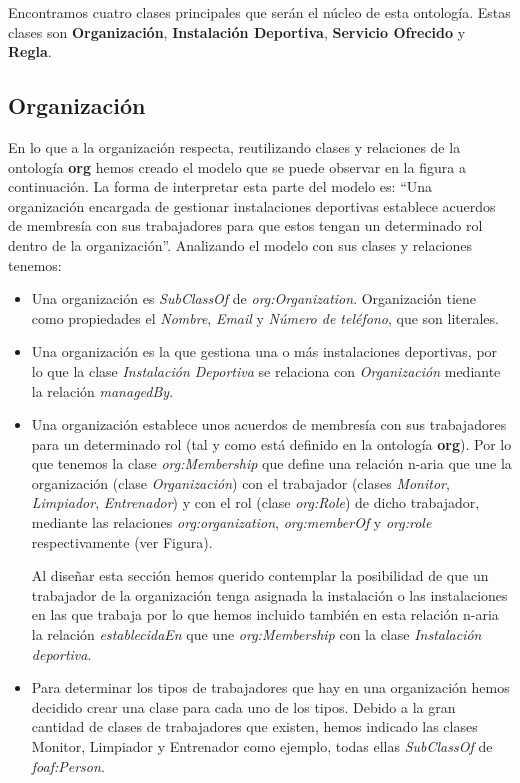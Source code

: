 \documentclass[a4paper,12pt]{article}
\begin{document}
	Encontramos cuatro clases principales que serán el núcleo de esta ontología. Estas clases son \textbf{Organización}, \textbf{Instalación Deportiva}, \textbf{Servicio Ofrecido} y \textbf{Regla}.
	
	
	\subsection{Organización}
	
	En lo que a la organización respecta, reutilizando clases y relaciones de la ontología \textbf{org} hemos creado el modelo que se puede observar en la figura a continuación. La forma de interpretar esta parte del modelo es: “Una organización encargada de gestionar instalaciones deportivas establece acuerdos de membresía con sus trabajadores para que estos tengan un determinado rol dentro de la organización”. Analizando el modelo con sus clases y relaciones tenemos:
	
	\begin{itemize}
		\item Una organización es \textit{SubClassOf} de \textit{org:Organization}. Organización tiene como propiedades el \textit{Nombre}, \textit{Email} y \textit{Número de teléfono}, que son literales.
		\item Una organización es la que gestiona una o más instalaciones deportivas, por lo que la clase \textit{Instalación Deportiva} se relaciona con \textit{Organización} mediante la relación \textit{managedBy}.
		
		\item Una organización establece unos acuerdos de membresía con sus trabajadores para un determinado rol (tal y como está definido en la ontología \textbf{org}). Por lo que tenemos la clase \textit{org:Membership} que define una relación n-aria que une la organización (clase \textit{Organización}) con el trabajador (clases \textit{Monitor}, \textit{Limpiador}, \textit{Entrenador}) y con el rol (clase \textit{org:Role}) de dicho trabajador, mediante las relaciones \textit{org:organization}, \textit{org:memberOf} y \textit{org:role} respectivamente (ver Figura). 
		
		Al diseñar esta sección hemos querido contemplar la posibilidad de que un trabajador de la organización tenga asignada la instalación o las instalaciones en las que trabaja por lo que hemos incluido también en esta relación n-aria la relación \textit{establecidaEn} que une \textit{org:Membership} con la clase \textit{Instalación deportiva}.
		\item Para determinar los tipos de trabajadores que hay en una organización hemos decidido crear una clase para cada uno de los tipos. Debido a la gran cantidad de clases de trabajadores que existen, hemos indicado las clases Monitor, Limpiador y Entrenador como ejemplo, todas ellas \textit{SubClassOf} de \textit{foaf:Person}.
	\end{itemize}
\end{document}
